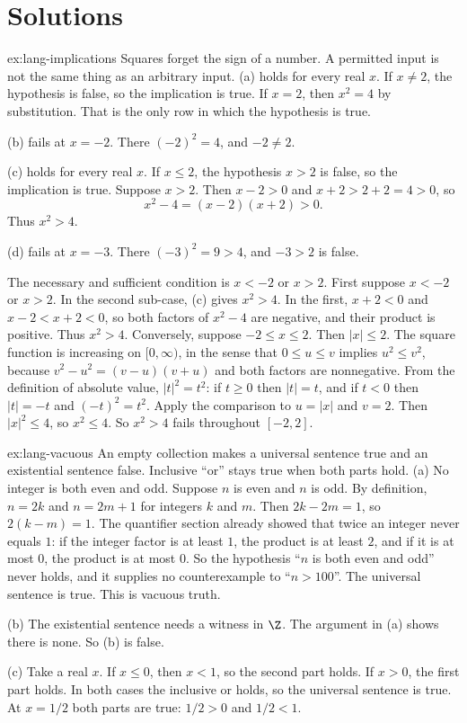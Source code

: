\section{Solutions}

\begin{solution}{ex:lang-implications}
\idea Squares forget the sign of a number. A permitted input is not the same thing as an arbitrary input.
\writeup (a) holds for every real $x$. If $x\ne 2$, the hypothesis is false, so the implication is true. If $x=2$, then $x^2=4$ by substitution. That is the only row in which the hypothesis is true.

(b) fails at $x=-2$. There $(-2)^2=4$, and $-2\ne 2$.

(c) holds for every real $x$. If $x\le 2$, the hypothesis $x>2$ is false, so the implication is true. Suppose $x>2$. Then $x-2>0$ and $x+2>2+2=4>0$, so
\[
x^2-4=(x-2)(x+2)>0.
\]
Thus $x^2>4$.

(d) fails at $x=-3$. There $(-3)^2=9>4$, and $-3>2$ is false.

The necessary and sufficient condition is $x<-2$ or $x>2$. First suppose $x<-2$ or $x>2$. In the second sub-case, (c) gives $x^2>4$. In the first, $x+2<0$ and $x-2<x+2<0$, so both factors of $x^2-4$ are negative, and their product is positive. Thus $x^2>4$. Conversely, suppose $-2\le x\le 2$. Then $|x|\le 2$. The square function is increasing on $[0,\infty)$, in the sense that $0\le u\le v$ implies $u^2\le v^2$, because $v^2-u^2=(v-u)(v+u)$ and both factors are nonnegative. From the definition of absolute value, $|t|^2=t^2$: if $t\ge 0$ then $|t|=t$, and if $t<0$ then $|t|=-t$ and $(-t)^2=t^2$. Apply the comparison to $u=|x|$ and $v=2$. Then $|x|^2\le 4$, so $x^2\le 4$. So $x^2>4$ fails throughout $[-2,2]$.
\end{solution}

\begin{solution}{ex:lang-vacuous}
\idea An empty collection makes a universal sentence true and an existential sentence false. Inclusive ``or'' stays true when both parts hold.
\writeup (a) No integer is both even and odd. Suppose $n$ is even and $n$ is odd. By definition, $n=2k$ and $n=2m+1$ for integers $k$ and $m$. Then $2k-2m=1$, so $2(k-m)=1$. The quantifier section already showed that twice an integer never equals $1$: if the integer factor is at least $1$, the product is at least $2$, and if it is at most $0$, the product is at most $0$. So the hypothesis ``$n$ is both even and odd'' never holds, and it supplies no counterexample to ``$n>100$''. The universal sentence is true. This is vacuous truth.

(b) The existential sentence needs a witness in $\Z$. The argument in (a) shows there is none. So (b) is false.

(c) Take a real $x$. If $x\le 0$, then $x<1$, so the second part holds. If $x>0$, the first part holds. In both cases the inclusive or holds, so the universal sentence is true. At $x=1/2$ both parts are true: $1/2>0$ and $1/2<1$.
\end{solution}

